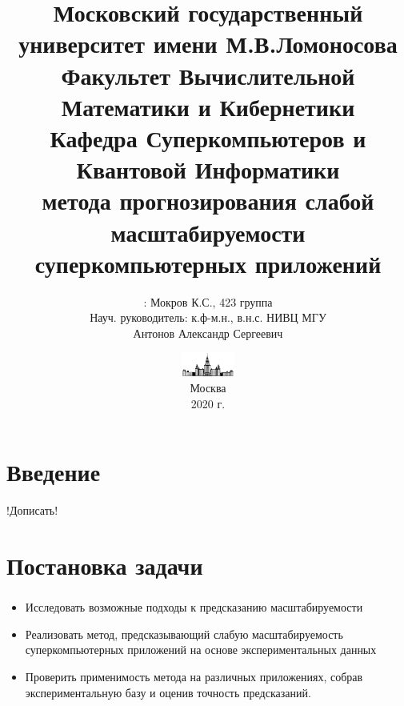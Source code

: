 \documentclass[unicode, t, 11pt]{beamer}%
\title{
	{\footnotesize\color{black}Московский государственный университет имени М.В.Ломоносова\\
    Факультет Вычислительной Математики и Кибернетики\\
    Кафедра Суперкомпьютеров и Квантовой Информатики\\}
    \vspace{\baselineskip}
    {\LARGEРазработка метода прогнозирования слабой масштабируемости суперкомпьютерных приложений}
}
\author{\footnotesizeСтудент: Мокров К.С., 423 группа\\
		Науч. руководитель: к.ф-м.н.,
		в.н.с. НИВЦ МГУ\\
		Антонов Александр Сергеевич}
\date{\includegraphics[height=0.8cm]{./images/MSU}\\
	  \scriptsize
	  Москва\\
	  2020 г.}
\begin{document}
	\frame[plain]{\titlepage}	%

	\section{Введение}
		\begin{frame}
		!Дописать!
		\end{frame}

	\section{Постановка задачи}
		\begin{frame}
			\frametitle{\insertsection}
			\begin{itemize}[label=\(\bullet\)]
				\item Исследовать возможные подходы к предсказанию масштабируемости
				\item Реализовать метод, предсказывающий слабую масштабируемость суперкомпьютерных приложений на основе экспериментальных данных
				\item Проверить применимость метода на различных приложениях, собрав экспериментальную базу и оценив точность предсказаний.
			\end{itemize}
		\end{frame}
\end{document}
